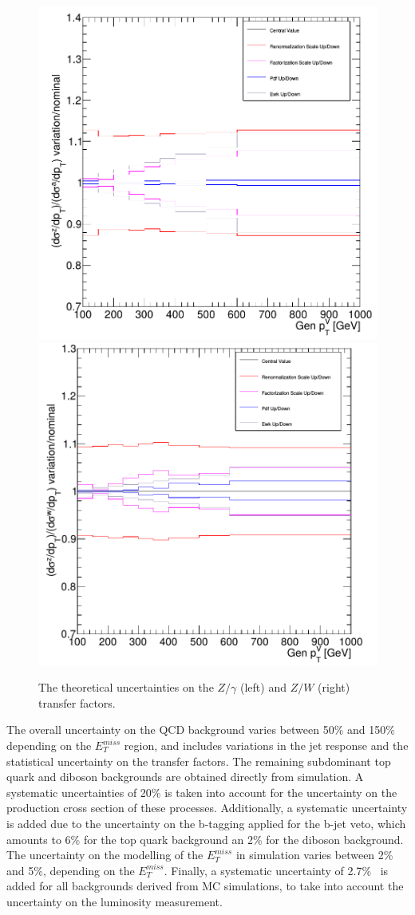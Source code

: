 \begin{figure}[ht]
  \centering
 \includegraphics[width=.49\textwidth]{syst1.png} 
 \includegraphics[width=.49\textwidth]{syst2.png}
 \caption{The theoretical uncertainties on the $Z/\gamma$ (left) and $Z/W$ (right) transfer factors.}
 \label{fig:transfer_factors_unc}
\end{figure}

The overall uncertainty on the QCD background varies between 50\% and 150\% depending on the $E_T^{miss}$ region, and includes variations in the jet response and the statistical uncertainty on the transfer factors. The remaining subdominant top quark and diboson backgrounds are obtained directly from simulation. A systematic uncertainties  of 20\% is taken into account for the uncertainty on the production cross section of these processes. Additionally, a systematic uncertainty is added due to the uncertainty on the b-tagging applied for the b-jet veto, which amounts to 6\% for the top quark background an 2\% for the diboson background. The uncertainty on the modelling of the $E_T^{miss}$ in simulation varies between 2\% and 5\%, depending on the $E_T^{miss}$. Finally, a systematic uncertainty of 2.7\%~\cite{CMS:2016eto} is added for all backgrounds derived from MC simulations, to take into account the uncertainty on the luminosity measurement.

